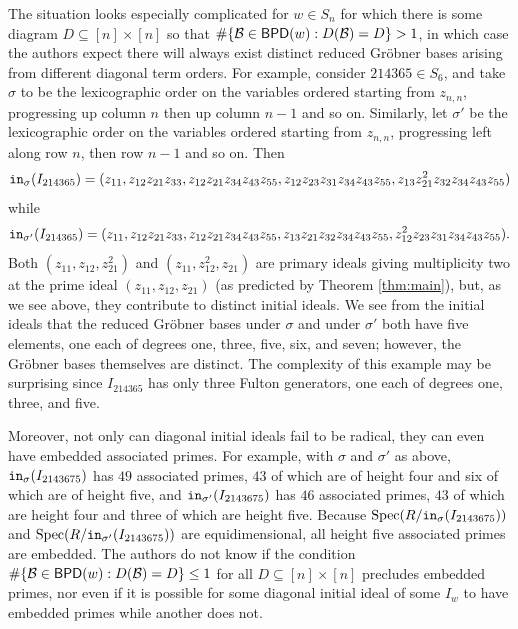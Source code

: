 \documentclass[12pt,reqno]{amsart}
\newtheorem{Main Conjecture}[theorem]{Main Conjecture}
\theoremstyle{remark}
\theoremstyle{plain}
\newcommand{\init}{{\tt in}}
\newcommand{\bpd}{{\sf BPD}}
\newcommand{\spec}{{\mbox{Spec}}}
\begin{document}
The situation looks especially complicated for $w \in S_n$ for which there is some diagram $D \subseteq [n] \times [n]$ so that $\#\{\mathcal B\in \bpd(w):D(\mathcal B)=D\}>1$, in which case the authors expect there will always  exist distinct reduced Gr\"obner bases arising from different diagonal term orders. 
 For example,  consider $214365 \in S_6$, and  take $\sigma$ to be the lexicographic order on the variables ordered starting from $z_{n,n}$, progressing up column $n$ then up column $n-1$ and so on.  Similarly, let $\sigma'$ be the lexicographic order on the variables ordered starting from $z_{n,n}$, progressing left along row $n$, then row $n-1$ and so on.
Then 
\[
\init_{\sigma} (I_{214365}) = (z_{11} ,z_{12}z_{21}z_{33}, z_{12}z_{21}z_{34}z_{43}z_{55}, z_{12}z_{23}z_{31}z_{34}z_{43}z_{55}, z_{13}z_{21}^2z_{32}z_{34}z_{43}z_{55})
\] 
while 
\[
\init_{\sigma'} (I_{214365}) = (z_{11} ,z_{12}z_{21}z_{33}, z_{12}z_{21}z_{34}z_{43}z_{55}, {z_{13}z_{21}z_{32}}z_{34}z_{43}z_{55}, z_{12}^2z_{23}z_{31}z_{34}z_{43}z_{55}).
\]  
Both $(z_{11}, z_{12}, z_{21}^2)$   and $(z_{11}, z_{12}^2, z_{21} )$ are primary ideals giving multiplicity two at the prime ideal $(z_{11}, z_{12}, z_{21})$ (as predicted by Theorem \ref{thm:main}), but, as we see above, they contribute to distinct initial ideals.  We see from the initial ideals that the reduced Gr\"obner bases under $\sigma$ and under $\sigma'$ both have five elements, one each of degrees one, three, five, six, and seven; however, the Gr\"obner bases themselves are distinct.  The complexity of this example may be surprising 
since $I_{214365}$ has only three Fulton generators, one each of degrees one, three, and five.

Moreover, not only can diagonal initial ideals fail to be radical, they can even have embedded associated primes. For example, with $\sigma$ and $\sigma'$ as above, $\init_\sigma(I_{2143675})$ has $49$ associated primes, $43$ of which are of height four and six of which are of height five, 
and $\init_{\sigma'}(I_{2143675})$ has  $46$ associated primes, $43$ of which are height four and three of which are height five. Because  $\spec(R/\init_\sigma(I_{2143675}))$ and $\spec(R/\init_{\sigma'}(I_{2143675}))$ are equidimensional, all height five associated primes are embedded. The authors do not know if the condition $\#\{\mathcal B\in \bpd(w):D(\mathcal B)=D\}\leq 1$ for all $D \subseteq [n] \times [n]$ precludes embedded primes, nor even if it is possible for some diagonal initial ideal of some $I_w$ to have embedded primes while another does not.  
\end{document}
